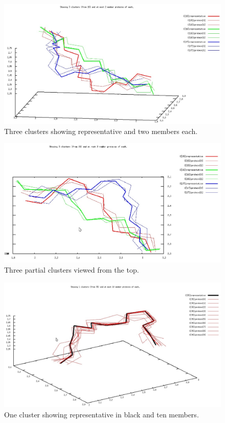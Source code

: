 \documentclass[a4paper,12pt,english]{report}
\begin{document}
\begin{figure}[!ht]
\begin{center}
\includegraphics [bb= 0 0 297 164]{images/threeclusters.jpg}
\end{center}
\caption{Three clusters showing representative and two members each.}
\label{threec}
\end{figure}

\begin{figure}[!ht]
\begin{center}
\includegraphics [bb= 0 0 297 164]{images/threeclusters-top.jpg}
\end{center}
\caption{Three partial clusters viewed from the top.}
\label{threec-t}
\end{figure}

\begin{figure}[!ht]
\begin{center}
\includegraphics [bb= 0 0 297 164]{images/onecluster.jpg}
\end{center}
\caption{One cluster showing representative in black and ten members.}
\label{onecluster}
\end{figure}
\end{document}
